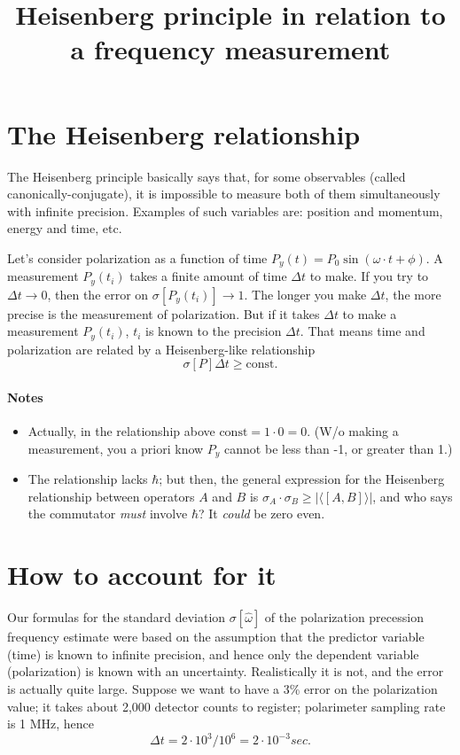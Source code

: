 \documentclass[a4paper,14pt]{article}
\newcommand{\avg}[1]{\langle {#1} \rangle}
\newcommand{\const}{\mathrm{const}}
\begin{document}
\title{Heisenberg principle in relation to a frequency measurement}
\maketitle{}

\section{The Heisenberg relationship}
The Heisenberg principle basically says that, for some observables (called canonically-conjugate),
it is impossible to measure both of them simultaneously with infinite precision.
Examples of such variables are: position and momentum, energy and time, etc.

Let's consider polarization as a function of time $P_y(t) = P_0\sin(\omega\cdot t + \phi)$. A measurement
$P_y(t_i)$ takes a finite amount of time $\Delta t$ to make. If you try to $\Delta t\to 0$, then the error
on $\sigma[P_y(t_i)]\to 1$. The longer you make $\Delta t$, the more precise is the measurement of
polarization. But if it takes $\Delta t$ to make a measurement $P_y(t_i)$, $t_i$ is known to
the precision $\Delta t$. That means time and polarization are related by a Heisenberg-like relationship
\[
\sigma[P]\Delta t \ge \const.
\]

\paragraph{Notes}
\begin{itemize}
\item Actually, in the relationship above $\const = 1\cdot 0 = 0$. (W/o making a measurement,
  you a priori know $P_y$ cannot be less than -1, or greater than 1.)
\item The relationship lacks $\hbar$; but then, the general expression for the Heisenberg relationship
  between operators $A$ and $B$ is $\sigma_A\cdot\sigma_B \ge |\avg{[A,B]}|$, and who says the commutator
  \emph{must} involve $\hbar$? It \emph{could} be zero even.
\end{itemize}
\section{How to account for it}

Our formulas for the standard deviation $\sigma[\hat\omega]$ of the polarization precession frequency estimate
were based on the assumption that the predictor variable (time) is known to infinite precision, and hence
only the dependent variable (polarization) is known with an uncertainty. Realistically it is not,
and the error is actually quite large. Suppose we want to have a 3\% error on the polarization value; it takes
about 2,000 detector counts to register; polarimeter sampling rate is 1 MHz, hence
\[
\Delta t = 2\cdot 10^3/10^6 = 2\cdot 10^{-3} sec.
\]
\end{document}
